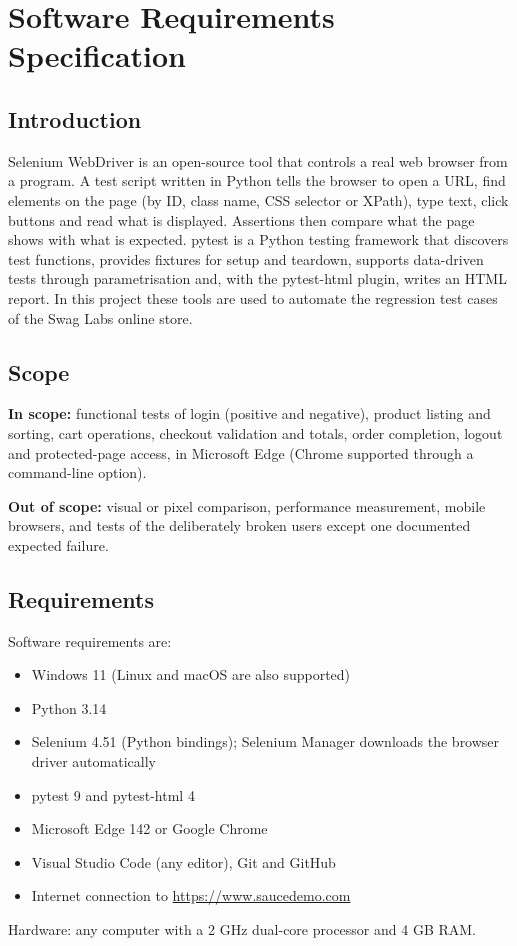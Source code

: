 \documentclass[12pt,a4paper]{article}
\begin{document}
\section{Software Requirements Specification}\label{sec:srs}
\subsection{Introduction}\label{sec:srs1}
Selenium WebDriver is an open-source tool that controls a real web browser from a program. A test script written in Python tells the browser to open a URL, find elements on the page (by ID, class name, CSS selector or XPath), type text, click buttons and read what is displayed. Assertions then compare what the page shows with what is expected. pytest is a Python testing framework that discovers test functions, provides fixtures for setup and teardown, supports data-driven tests through parametrisation and, with the pytest-html plugin, writes an HTML report. In this project these tools are used to automate the regression test cases of the Swag Labs online store.

\subsection{Scope}\label{sec:srs2}
\textbf{In scope:} functional tests of login (positive and negative), product listing and sorting, cart operations, checkout validation and totals, order completion, logout and protected-page access, in Microsoft Edge (Chrome supported through a command-line option).

\textbf{Out of scope:} visual or pixel comparison, performance measurement, mobile browsers, and tests of the deliberately broken users except one documented expected failure.

\subsection{Requirements}\label{sec:srs3}
Software requirements are:
\begin{itemize}[nosep]
  \item Windows 11 (Linux and macOS are also supported)
  \item Python 3.14
  \item Selenium 4.51 (Python bindings); Selenium Manager downloads the browser driver automatically
  \item pytest 9 and pytest-html 4
  \item Microsoft Edge 142 or Google Chrome
  \item Visual Studio Code (any editor), Git and GitHub
  \item Internet connection to \url{https://www.saucedemo.com}
\end{itemize}
Hardware: any computer with a 2 GHz dual-core processor and 4 GB RAM.
\end{document}
